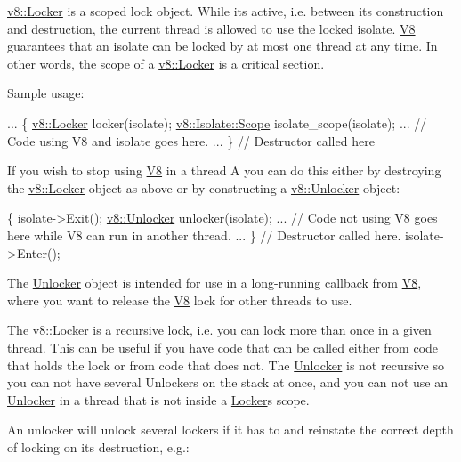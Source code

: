 \hyperlink{classv8_1_1_locker}{v8\+::\+Locker} is a scoped lock object. While it\textquotesingle{}s active, i.\+e. between its construction and destruction, the current thread is allowed to use the locked isolate. \hyperlink{classv8_1_1_v8}{V8} guarantees that an isolate can be locked by at most one thread at any time. In other words, the scope of a \hyperlink{classv8_1_1_locker}{v8\+::\+Locker} is a critical section.

Sample usage\+: 
\begin{DoxyCode}
...
\{
  \hyperlink{classv8_1_1_locker}{v8::Locker} locker(isolate);
  \hyperlink{classv8_1_1_isolate_1_1_scope}{v8::Isolate::Scope} isolate\_scope(isolate);
  ...
  \textcolor{comment}{// Code using V8 and isolate goes here.}
  ...
\} \textcolor{comment}{// Destructor called here}
\end{DoxyCode}


If you wish to stop using \hyperlink{classv8_1_1_v8}{V8} in a thread A you can do this either by destroying the \hyperlink{classv8_1_1_locker}{v8\+::\+Locker} object as above or by constructing a \hyperlink{classv8_1_1_unlocker}{v8\+::\+Unlocker} object\+:


\begin{DoxyCode}
\{
  isolate->Exit();
  \hyperlink{classv8_1_1_unlocker}{v8::Unlocker} unlocker(isolate);
  ...
  \textcolor{comment}{// Code not using V8 goes here while V8 can run in another thread.}
  ...
\} \textcolor{comment}{// Destructor called here.}
isolate->Enter();
\end{DoxyCode}


The \hyperlink{classv8_1_1_unlocker}{Unlocker} object is intended for use in a long-\/running callback from \hyperlink{classv8_1_1_v8}{V8}, where you want to release the \hyperlink{classv8_1_1_v8}{V8} lock for other threads to use.

The \hyperlink{classv8_1_1_locker}{v8\+::\+Locker} is a recursive lock, i.\+e. you can lock more than once in a given thread. This can be useful if you have code that can be called either from code that holds the lock or from code that does not. The \hyperlink{classv8_1_1_unlocker}{Unlocker} is not recursive so you can not have several Unlockers on the stack at once, and you can not use an \hyperlink{classv8_1_1_unlocker}{Unlocker} in a thread that is not inside a \hyperlink{classv8_1_1_locker}{Locker}\textquotesingle{}s scope.

An unlocker will unlock several lockers if it has to and reinstate the correct depth of locking on its destruction, e.\+g.\+:


